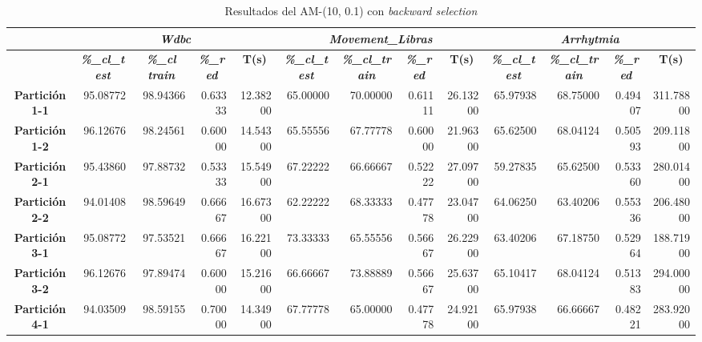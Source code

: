 \documentclass[a4paper,11pt]{article}
\begin{document}
  
  \begin{table}[H]
  \caption{Resultados del AM-(10, 0.1) con \textit{backward selection}}
  \begin{adjustbox}{width=1.1\textwidth}
  \begin{tabular}{|c|r|r|r|r|r|r|r|r|r|r|r|r|}
  \hline
  \multicolumn{1}{|l|}{} & \multicolumn{ 4}{c|}{\textbf{\textit{Wdbc}}} & \multicolumn{ 4}{c|}{\textbf{\textit{Movement\_Libras}}} & \multicolumn{ 4}{c|}{\textbf{\textit{Arrhytmia}}} \\ \hline
  \multicolumn{1}{|l|}{} & \multicolumn{1}{c|}{\textbf{\textit{\%\_cl\_test}}} & \multicolumn{1}{c|}{\textbf{\textit{\%\_cl train}}} & \multicolumn{1}{c|}{\textbf{\textit{\%\_red}}} & \multicolumn{1}{c|}{\textbf{T(s)}} & \multicolumn{1}{c|}{\textbf{\textit{\%\_cl\_test}}} & \multicolumn{1}{c|}{\textbf{\textit{\%\_cl\_train}}} & \multicolumn{1}{c|}{\textbf{\textit{\%\_red}}} & \multicolumn{1}{c|}{\textbf{T(s)}} & \multicolumn{1}{c|}{\textbf{\textit{\%\_cl\_test}}} & \multicolumn{1}{c|}{\textbf{\textit{\%\_cl\_train}}} & \multicolumn{1}{c|}{\textbf{\textit{\%\_red}}} & \multicolumn{1}{c|}{\textbf{T(s)}} \\ \hline
  \textbf{Partición 1-1} & 95.08772 & 98.94366 & 0.63333 & 12.38200 & 65.00000 & 70.00000 & 0.61111 & 26.13200 & 65.97938 & 68.75000 & 0.49407 & 311.78800 \\ \hline
  \textbf{Partición 1-2} & 96.12676 & 98.24561 & 0.60000 & 14.54300 & 65.55556 & 67.77778 & 0.60000 & 21.96300 & 65.62500 & 68.04124 & 0.50593 & 209.11800 \\ \hline
  \textbf{Partición 2-1} & 95.43860 & 97.88732 & 0.53333 & 15.54900 & 67.22222 & 66.66667 & 0.52222 & 27.09700 & 59.27835 & 65.62500 & 0.53360 & 280.01400 \\ \hline
  \textbf{Partición 2-2} & 94.01408 & 98.59649 & 0.66667 & 16.67300 & 62.22222 & 68.33333 & 0.47778 & 23.04700 & 64.06250 & 63.40206 & 0.55336 & 206.48000 \\ \hline
  \textbf{Partición 3-1} & 95.08772 & 97.53521 & 0.66667 & 16.22100 & 73.33333 & 65.55556 & 0.56667 & 26.22900 & 63.40206 & 67.18750 & 0.52964 & 188.71900 \\ \hline
  \textbf{Partición 3-2} & 96.12676 & 97.89474 & 0.60000 & 15.21600 & 66.66667 & 73.88889 & 0.56667 & 25.63700 & 65.10417 & 68.04124 & 0.51383 & 294.00000 \\ \hline
  \textbf{Partición 4-1} & 94.03509 & 98.59155 & 0.70000 & 14.34900 & 67.77778 & 65.00000 & 0.47778 & 24.92100 & 65.97938 & 66.66667 & 0.48221 & 283.92000 \\ \hline

\end{tabular}
\end{adjustbox}
\end{table}
\end{document}
